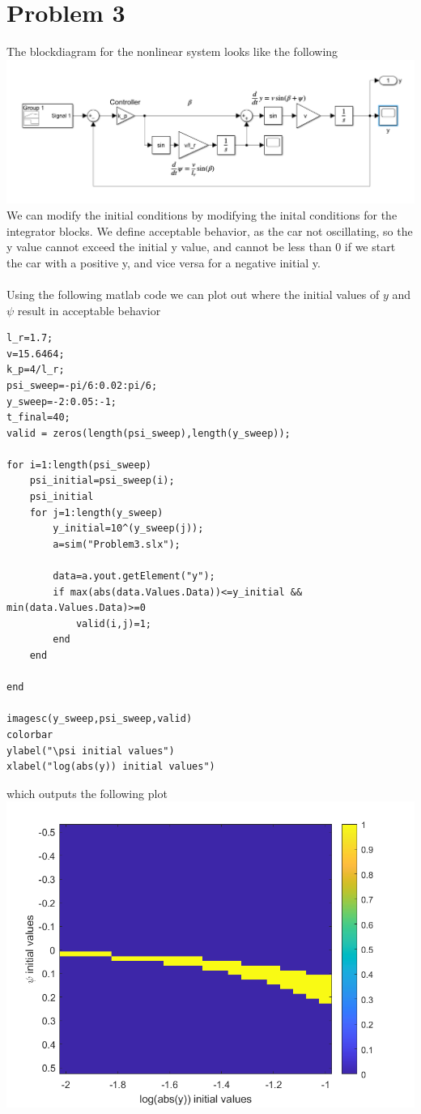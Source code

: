 \documentclass[12pt]{article}
\begin{document}
\section*{Problem 3}
The blockdiagram for the nonlinear system looks like the following\\
\includegraphics[scale=0.4]{Problem3BlockDiagram.PNG}\\
We can modify the initial conditions by modifying the inital conditions for the integrator blocks. We define acceptable behavior, 
as the car not oscillating, so the y value cannot exceed the initial y value, and cannot be less than 0 if we start the car with a positive y,
and vice versa for a negative initial y.
\\\\
Using the following matlab code we can plot out where the initial values of $y$ and $\psi$ result in acceptable behavior
\begin{verbatim}
l_r=1.7;
v=15.6464;
k_p=4/l_r;
psi_sweep=-pi/6:0.02:pi/6;
y_sweep=-2:0.05:-1;
t_final=40;
valid = zeros(length(psi_sweep),length(y_sweep));

for i=1:length(psi_sweep)
    psi_initial=psi_sweep(i);
    psi_initial
    for j=1:length(y_sweep)
        y_initial=10^(y_sweep(j));
        a=sim("Problem3.slx");

        data=a.yout.getElement("y");
        if max(abs(data.Values.Data))<=y_initial && min(data.Values.Data)>=0
            valid(i,j)=1;
        end
    end

end

imagesc(y_sweep,psi_sweep,valid)
colorbar
ylabel("\psi initial values")
xlabel("log(abs(y)) initial values")
\end{verbatim}
which outputs the following plot\\
\includegraphics[scale=0.4]{Problem3Fig1.png}\\
\end{document}
